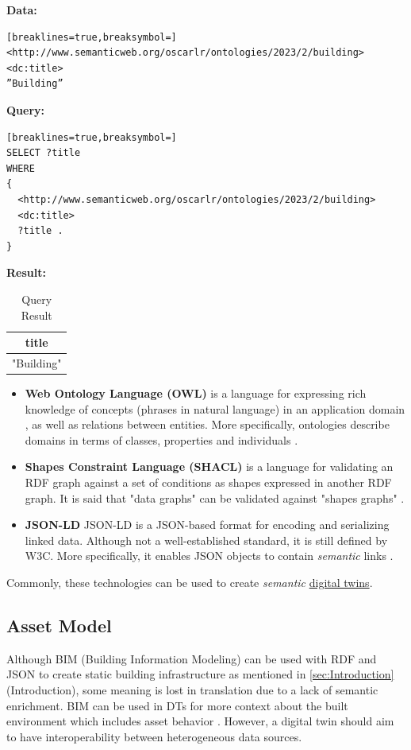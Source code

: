 \documentclass{article}
\begin{document}
\textbf{Data:}
\begin{Verbatim}[breaklines=true,breaksymbol=]
<http://www.semanticweb.org/oscarlr/ontologies/2023/2/building> 
<dc:title> 
”Building”
\end{Verbatim}
\textbf{Query:}
\begin{Verbatim}[breaklines=true,breaksymbol=]
SELECT ?title 
WHERE
{
  <http://www.semanticweb.org/oscarlr/ontologies/2023/2/building> 
  <dc:title> 
  ?title . 
}
\end{Verbatim}
\textbf{Result:}
\begin{table}[H]
    \begin{tabular}{|c|}
        \hline
        \textbf{title} \\
        \hline
        "Building" \\
        \hline
    \end{tabular}
    \caption{Query Result}
    \label{tab:my_label}
\end{table}
    

\begin{itemize}
    \item \textbf{Web Ontology Language (OWL)} is a language for expressing rich knowledge of concepts (phrases in natural language) in an application domain \cite{szolovits_overview_1977}, as well as relations between entities. More specifically, ontologies describe domains in terms of classes, properties and individuals \cite{bechhofer_owl_2009}.

    \item \textbf{Shapes Constraint Language (SHACL)} is a language for validating an RDF graph against a set of conditions as shapes expressed in another RDF graph. It is said that "data graphs" can be validated against "shapes graphs" \cite{noauthor_shapes_nodate}.
    
    \item \textbf{JSON-LD} JSON-LD is a JSON-based format for encoding and serializing linked data. Although not a well-established standard, it is still defined by W3C.  More specifically, it enables JSON objects to contain \emph{semantic} links \cite{noauthor_json-based_nodate}.
\end{itemize}

Commonly, these technologies can be used to create \emph{semantic} \hyperref[subsec:DigitalTwins]{digital twins}.

\subsection{Asset Model}\label{subsec:AssetModel}
Although BIM (Building Information Modeling) can be used with RDF and JSON to create static building infrastructure as mentioned in \ref{sec:Introduction}(Introduction), some meaning is lost in translation due to a lack of semantic enrichment. BIM can be used in DTs for more context about the built environment which includes asset behavior \cite{godager_concept_2021}. However, a digital twin should aim to have interoperability between heterogeneous data sources.
\end{document}
